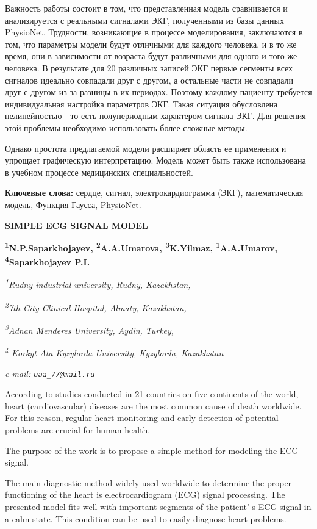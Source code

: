 {Важность работы состоит в том, что представленная модель сравнивается и
анализируется с реальными сигналами ЭКГ, полученными из базы данных
PhysioNet. Трудности, возникающие в процессе моделирования, заключаются
в том, что параметры модели будут отличными для каждого человека, и в то
же время, они в зависимости от возраста будут различными для одного и
того же человека. В результате для 20 различных записей ЭКГ первые
сегменты всех сигналов идеально совпадали друг с другом, а остальные
части не совпадали друг с другом из-за разницы в их периодах. Поэтому
каждому пациенту требуется индивидуальная настройка параметров ЭКГ.
Такая ситуация обусловлена нелинейностью - то есть полупериодным
характером сигнала ЭКГ. Для решения этой проблемы необходимо
использовать более сложные методы.

Однако простота предлагаемой модели расширяет область ее применения и
упрощает графическую интерпретацию. Модель может быть также использована
в учебном процессе медицинских специальностей.

{\bfseries Ключевые слова:} сердце, сигнал, электрокардиограмма (ЭКГ),
математическая модель, Функция Гаусса, PhysioNet.

{\bfseries SIMPLE ECG SIGNAL MODEL}

{\bfseries \textsuperscript{1}N.P.Saparkhojayev,
\textsuperscript{2}A.A.Umarova, \textsuperscript{3}K.Yilmaz,
\textsuperscript{1}A.A.Umarov, \textsuperscript{4}Saparkhojayev P.I.}

\emph{\textsuperscript{1}Rudny industrial university, Rudny,
Kazakhstan,}

\emph{\textsuperscript{2}7th City Clinical Hospital, Almaty,
Kazakhstan,}

\emph{\textsuperscript{3}Adnan Menderes University, Aydin, Turkey,}

\emph{\textsuperscript{4} Korkyt Ata Kyzylorda University, Kyzylorda,
Kazakhstan}

\emph{e-mail: \href{mailto:uaa_77@mail.ru}{\nolinkurl{uaa\_77@mail.ru}}}

According to studies conducted in 21 countries on five continents of the
world, heart (cardiovascular) diseases are the most common cause of
death worldwide. For this reason, regular heart monitoring and early
detection of potential problems are crucial for human health.

The purpose of the work is to propose a simple method for modeling the
ECG signal.

The main diagnostic method widely used worldwide to determine the proper
functioning of the heart is electrocardiogram (ECG) signal processing.
The presented model fits well with important segments of the
patient' s ECG signal in a calm state. This condition can
be used to easily diagnose heart problems.

}
